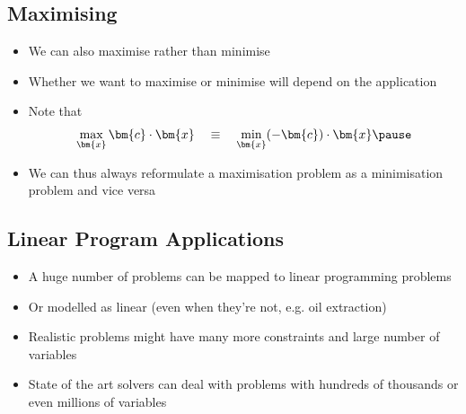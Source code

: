 
\begin{slide}
\section{Maximising}

\begin{PauseHighLight}
  \begin{itemize}
  \item We can also maximise rather than minimise\pause
  \item Whether we want to maximise or minimise will depend on the
    application\pause
  \item Note that
    \begin{align*}
      \max_{\bm{x}}\bm{c}\cdot \bm{x} \quad \equiv \quad \min_{\bm{x}}
      (-\bm{c}) \cdot \bm{x}\pause
    \end{align*}
  \item We can thus always reformulate a maximisation problem as a
    minimisation problem and vice versa\pause
  \end{itemize}
\end{PauseHighLight}

\end{slide}


\begin{slide}
\section{Linear Program Applications}

\begin{PauseHighLight}
  \begin{itemize}
  \item A huge number of problems can be mapped to linear programming problems\pause
  \item Or modelled as linear (even when they're not, e.g. oil
    extraction)\pause
  \item Realistic problems might have many more constraints and large
    number of variables\pause
  \item State of the art solvers can deal with problems with hundreds of
    thousands or even millions of variables\pause
  \end{itemize}
\end{PauseHighLight}

\end{slide}


